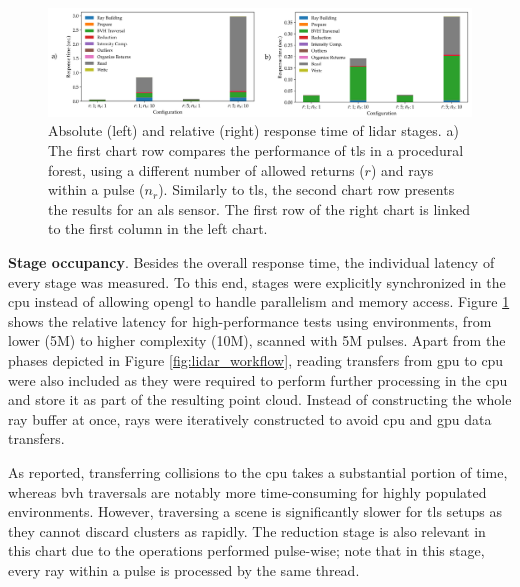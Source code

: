 \begin{figure}
    \centering
    \includegraphics[width=\linewidth]{figs/lidar_simulation/lidar_response_time_stage.png}
	\caption{Absolute (left) and relative (right) response time of \acrshort{lidar} stages. a) The first chart row compares the performance of \acrshort{tls} in a procedural forest, using a different number of allowed returns ($r$) and rays within a pulse ($n_r$). Similarly to \acrshort{tls}, the second chart row presents the results for an \acrshort{als} sensor. The first row of the right chart is linked to the first column in the left chart.}
	\label{fig:lidar_response_time_chart}
\end{figure}

\textbf{Stage occupancy}. Besides the overall response time, the individual latency of every stage was measured. To this end, stages were explicitly synchronized in the \acrshort{cpu} instead of allowing \acrshort{opengl} to handle parallelism and memory access. Figure \ref{fig:lidar_response_time_chart} shows the relative latency for high-performance tests using environments, from lower (5M) to higher complexity (10M), scanned with 5M pulses. Apart from the phases depicted in Figure \ref{fig:lidar_workflow}, reading transfers from \acrshort{gpu} to \acrshort{cpu} were also included as they were required to perform further processing in the \acrshort{cpu} and store it as part of the resulting point cloud. Instead of constructing the whole ray buffer at once, rays were iteratively constructed to avoid \acrshort{cpu} and \acrshort{gpu} data transfers.

As reported, transferring collisions to the \acrshort{cpu} takes a substantial portion of time, whereas \acrshort{bvh} traversals are notably more time-consuming for highly populated environments. However, traversing a scene is significantly slower for \acrshort{tls} setups as they cannot discard clusters as rapidly. The reduction stage is also relevant in this chart due to the operations performed pulse-wise; note that in this stage, every ray within a pulse is processed by the same thread. 

\newcommand{\datasetImageHeight}{-.09\totalheight}
\newcommand{\datasetImageSize}{1.8cm}
\newcommand{\lidarCoreLabel}{ToF Solver}

